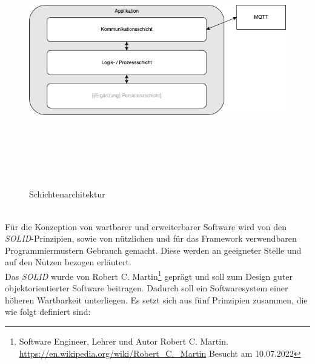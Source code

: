     \begin{figure}[hbt!]
        \centering
        \includegraphics[width=14cm,height=11cm,keepaspectratio]{images/Schichtenarchitektur.png}
        \caption{Schichtenarchitektur}
        \label{fig:schichtenarchitektur}
    \end{figure}
    \\
    Für die Konzeption von wartbarer und erweiterbarer Software wird von den \textit{SOLID}-Prinzipien, sowie von nützlichen 
    und für das Framework verwendbaren Programmiermustern Gebrauch gemacht. Diese werden an geeigneter Stelle und auf den Nutzen bezogen erläutert.
    \\
    \linebreak
    Das \textit{SOLID} wurde von Robert C. Martin\footnote{Software Engineer, Lehrer und Autor Robert C. Martin. \url{https://en.wikipedia.org/wiki/Robert_C._Martin} Besucht am 10.07.2022} 
    geprägt und soll zum Design guter objektorientierter Software beitragen. Dadurch soll 
    ein Softwaresystem einer höheren Wartbarkeit unterliegen. Es setzt sich aus fünf Prinzipien zusammen, %
    die wie folgt definiert sind:
